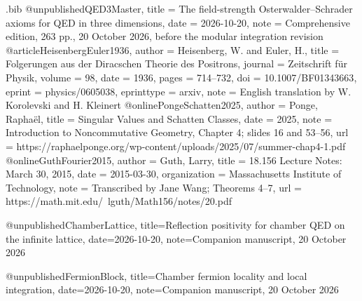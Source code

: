 \begin{filecontents*}[overwrite]{\jobname.bib}
@unpublished{QED3Master,
  title = {The field-strength {Osterwalder--Schrader} axioms for {QED} in three dimensions},
  date = {2026-10-20},
  note = {Comprehensive edition, 263 pp., 20 October 2026, before the modular integration revision}
}
@article{HeisenbergEuler1936,
  author = {Heisenberg, W. and Euler, H.},
  title = {Folgerungen aus der {Diracschen} Theorie des Positrons},
  journal = {Zeitschrift f{\"u}r Physik},
  volume = {98},
  date = {1936},
  pages = {714--732},
  doi = {10.1007/BF01343663},
  eprint = {physics/0605038},
  eprinttype = {arxiv},
  note = {English translation by W. Korolevski and H. Kleinert}
}
@online{PongeSchatten2025,
  author = {Ponge, Rapha{\"e}l},
  title = {Singular Values and Schatten Classes},
  date = {2025},
  note = {Introduction to Noncommutative Geometry, Chapter 4; slides 16 and 53--56},
  url = {https://raphaelponge.org/wp-content/uploads/2025/07/summer-chap4-1.pdf}
}
@online{GuthFourier2015,
  author = {Guth, Larry},
  title = {18.156 Lecture Notes: {March} 30, 2015},
  date = {2015-03-30},
  organization = {Massachusetts Institute of Technology},
  note = {Transcribed by Jane Wang; Theorems 4--7},
  url = {https://math.mit.edu/~lguth/Math156/notes/20.pdf}
}

@unpublished{ChamberLattice,
 title={Reflection positivity for chamber {QED} on the infinite lattice},
 date={2026-10-20}, note={Companion manuscript, 20 October 2026}}

@unpublished{FermionBlock,
 title={Chamber fermion locality and local integration},
 date={2026-10-20}, note={Companion manuscript, 20 October 2026}}
\end{filecontents*}
\documentclass[11pt,letterpaper,reqno]{amsart}
\makeatletter
{}[2020/10/01]

\RequirePackage[T1]{fontenc}
\RequirePackage{lmodern}
\RequirePackage{microtype}
\RequirePackage[letterpaper,margin=1in,headheight=15pt]{geometry}
\RequirePackage{amsmath,amsthm,amssymb,mathtools}
\RequirePackage{enumitem}
\RequirePackage{perpage}
\RequirePackage{xcolor}
\RequirePackage[breaklinks=true,colorlinks=true,
  linkcolor=manuscriptred,citecolor=manuscriptblue,urlcolor=manuscriptmagenta]{hyperref}
\RequirePackage{cleveref}

